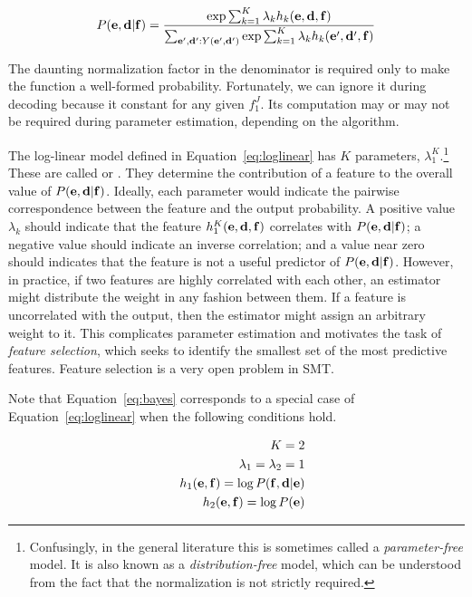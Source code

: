 \begin{equation}
P({\bf e},{\bf d}|{\bf f}) =
\frac{\exp \sum_{k=1}^K \lambda_k h_k({\bf e},{\bf d},{\bf f})}{ \sum_{{\bf e}',{\bf d}':Y({\bf e}',{\bf d}')} \exp \sum_{k=1}^K \lambda_k h_k({\bf e}',{\bf d}',{\bf f})}\label{eq:loglinear}
\end{equation}

\noindent The daunting normalization factor in the denominator
is required only to make the function a well-formed 
probability.  Fortunately, we can ignore it during decoding
because it constant for any given $f_1^J$.  Its computation
may or may not be required during parameter estimation, depending
on the algorithm.

The log-linear model defined in Equation~\ref{eq:loglinear}
has $K$ parameters, $\lambda_1^K$.\footnote{Confusingly,
in the general literature this is sometimes
called a {\em parameter-free} model.  It is also known as
a {\em distribution-free} model, which can be understood
from the fact that the normalization is not 
strictly required.}  These are called 
 or .
They determine the contribution of a feature to the overall 
value of $P({\bf e},{\bf d}|{\bf f})$.  Ideally, each parameter
would indicate the pairwise correspondence between the
feature and the output probability.  A positive value 
$\lambda_k$ should indicate that the feature
$h_1^K({\bf e},{\bf d},{\bf f})$ correlates with  
$P({\bf e},{\bf d}|{\bf f})$; a negative value should indicate
an inverse correlation; and a value near zero should
indicates that the feature is not a useful predictor of
$P({\bf e},{\bf d}|{\bf f})$.  However, in practice, if two features
are highly correlated with each other, an estimator might distribute the
weight in any fashion between them.  If a feature is
uncorrelated with the output, then the estimator might
assign an arbitrary weight to it.  This complicates
parameter estimation and motivates the task of {\em feature
selection}, which seeks to identify the smallest set
of the most predictive features.  Feature selection is
a very open problem in SMT.

Note that Equation~\ref{eq:bayes} corresponds to a 
special case of Equation~\ref{eq:loglinear}
when the following conditions hold.

\begin{eqnarray*}
&&K = 2 \\
&&\lambda_1 = \lambda_2 = 1 \\
&&h_1({\bf e},{\bf f}) = \log P({\bf f},{\bf d}|{\bf e})\\
&& h_2({\bf e},{\bf f}) = \log P({\bf e})
\end{eqnarray*}

